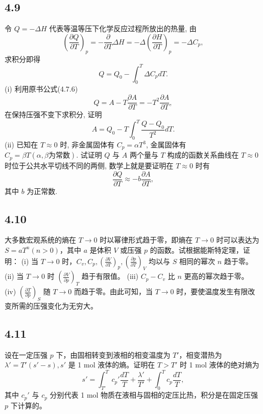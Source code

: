 \subsection{4.9}
令 $Q = -\Delta H$ 代表等温等压下化学反应过程所放出的热量, 由
$$\left( \frac{\partial Q}{\partial T} \right)_p = - \frac{\partial}{\partial T} \Delta H = - \Delta \left( \frac{\partial H}{\partial T} \right)_p = - \Delta C_p,$$
求积分即得
$$Q = Q_0 - \int_{0}^{T} \Delta C_p dT.$$
(i) 利用原书公式(4.7.6)
$$Q = A - T \frac{\partial A}{\partial T} = - T^2 \frac{\partial A}{\partial T},$$
在保持压强不变下求积分, 证明
$$A = Q_0 - T \int_{0}^{T} \frac{Q - Q_0}{T^2} dT.$$
(ii) 已知在 $T \approx 0$ 时, 非金属固体有 $C_p = \alpha T^3$, 金属固体有 $C_p = \beta T (\alpha, \beta 为常数).$ 试证明 $Q$ 与 $A$ 两个量与 $T$ 构成的函数关系曲线在 $T \approx 0$ 时位于公共水平切线不同的两侧, 数学上就是要证明在 $T \approx 0$ 时有
$$\frac{\partial Q}{\partial T} \approx - b \frac{\partial A}{\partial T},$$
其中 $b$ 为正常数.

\newpage
\subsection{4.10}
大多数宏观系统的熵在 $T \rightarrow 0$ 时以幂律形式趋于零，即熵在 $T \rightarrow 0$ 时可以表达为 $S = aT^n(n>0)$，其中 $a$ 是体积 $V$ 或压强 $p$ 的函数。试根据能斯特定理，证明：
(i) 当 $T \rightarrow 0$ 时，$C_v, C_p, \left( \frac{\partial V}{\partial T} \right)_p, \left( \frac{\partial p}{\partial T} \right)_V$ 均以与 $S$ 相同的幂次 $n$ 趋于零。
(ii) 当 $T \rightarrow 0$ 时 $\left( \frac{\partial V}{\partial p} \right)_T$ 趋于有限值。
(iii) $C_p - C_v$ 比 $n$ 更高的幂次趋于零。
(iv) $\left( \frac{\partial T}{\partial p} \right)_S$ 随 $T \rightarrow 0$ 而趋于零。由此可知，当 $T \rightarrow 0$ 时，要使温度发生有限改变所需的压强变化为无穷大。

\newpage
\subsection{4.11}
设在一定压强 $p$ 下，由固相转变到液相的相变温度为 $T'$，相变潜热为 $\lambda' = T'(s'-s), s'$ 是 1 mol 液体的熵。证明在 $T > T'$ 时 1 mol 液体的绝对熵为
$$s' = \int_{T'}^{T} c_p' \frac{dT}{T} + \frac{\lambda'}{T'} + \int_{0}^{T} c_p \frac{dT}{T},$$
其中 $c_p'$ 与 $c_p$ 分别代表 1 mol 物质在液相与固相的定压比热，积分是在固定压强 $p$ 下计算的。